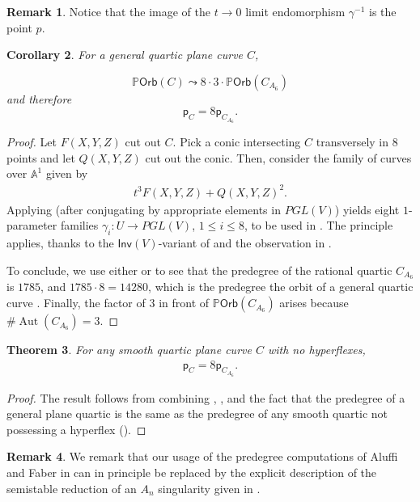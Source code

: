 \documentclass[12 pt, reqno]{amsart}
\newtheorem{thm}{Theorem}[section]
\newtheorem{cor}[thm]{Corollary}
\theoremstyle{definition}
\newtheorem{rmk}[thm]{Remark}
\newcommand{\on}{\operatorname}
\newcommand{\mb}{\mathbb}
\renewcommand{\P}{\mb{P}}
\newcommand{\Orb}{\mathsf{Orb}}
\newcommand{\p}{\mathsf{p}}
\begin{document}
\begin{rmk}
  \label{rmk:imageA6}
  Notice that the image of the $t \to 0$ limit endomorphism
  $\gamma^{-1}$ is the point $p$.
\end{rmk}

\begin{cor}
\label{cor24}
For a general quartic plane curve $C$,

\[ \P \Orb(C) \leadsto 8 \cdot 3 \cdot \P \Orb({C_{A_6}})\] and
therefore
\[\p_C = 8 \p_{C_{A_6}}.\]
\end{cor}

\begin{proof}
  Let $F(X,Y,Z)$ cut out $C$. Pick a conic intersecting $C$
  transversely in 8 points and let $Q(X,Y,Z)$ cut out the conic. Then,
  consider the family of curves over $\mb{A}^1$ given by
\begin{align*}
  t^3F(X,Y,Z)+Q(X,Y,Z)^2.
\end{align*}
Applying  (after conjugating by appropriate elements
in $PGL(V)$) yields eight $1$-parameter families
$\gamma_i: U\to PGL(V)$, $1\leq i\leq 8$, to be used in
. The principle applies, thanks to the
$\mathsf{Inv}(V)$-variant of  and the observation in
.


To conclude, we use either \cite[Example 5.4]{AF00} or
 to see that the predegree of the rational quartic
$C_{A_6}$ is $1785$, and $1785\cdot 8=14280$, which is the predegree
the orbit of a general quartic curve \cite{AF93}. Finally, the factor
of $3$ in front of $\P \Orb(C_{A_6})$ arises because
$\#\on{Aut}(C_{A_6})=3$.
\end{proof}

\begin{thm}
\label{smooth}
For any smooth quartic plane curve $C$ with no hyperflexes,
\begin{align*}
  \p_C = 8 \p_{C_{A_6}}.
\end{align*}
\end{thm}

\begin{proof}
  The result follows from combining , ,
  and the fact that the predegree of a general plane quartic is the
  same as the predegree of any smooth quartic not possessing a
  hyperflex (\cite{AF93}).
\end{proof}

\begin{rmk}
  We remark that our usage of the predegree computations of Aluffi and
  Faber in \cite{AF93} can in principle be replaced by the explicit
  description of the semistable reduction of an $A_n$ singularity
  given in \cite{CL13}.
\end{rmk}
\end{document}
